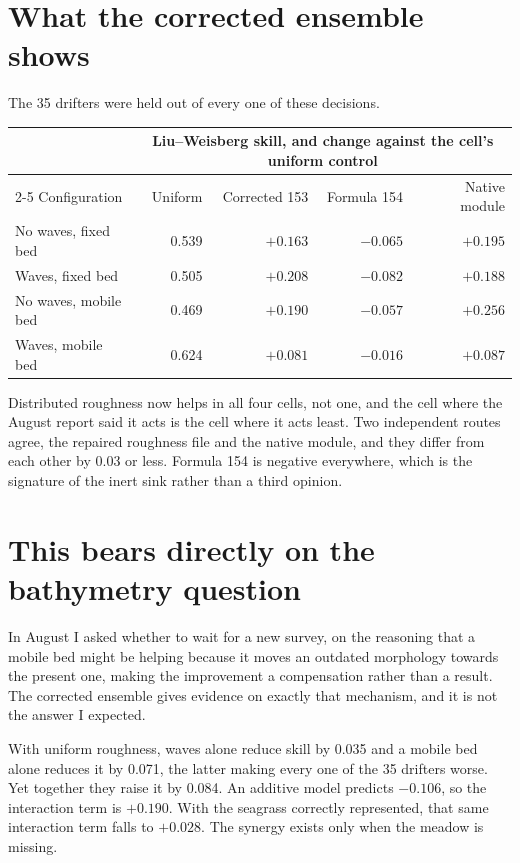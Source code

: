\documentclass[11pt]{article}
\begin{document}
\section{What the corrected ensemble shows}

The 35 drifters were held out of every one of these decisions.

\begin{center}
\begin{tabular}{lrrrr}
\toprule
& \multicolumn{4}{c}{Liu--Weisberg skill, and change against the cell's uniform control} \\
\cmidrule(l){2-5}
Configuration & Uniform & Corrected 153 & Formula 154 & Native module \\
\midrule
No waves, fixed bed   & 0.539 & $+0.163$ & $-0.065$ & $+0.195$ \\
Waves, fixed bed      & 0.505 & $+0.208$ & $-0.082$ & $+0.188$ \\
No waves, mobile bed  & 0.469 & $+0.190$ & $-0.057$ & $+0.256$ \\
Waves, mobile bed     & 0.624 & $+0.081$ & $-0.016$ & $+0.087$ \\
\bottomrule
\end{tabular}
\end{center}

Distributed roughness now helps in all four cells, not one, and the cell where
the August report said it acts is the cell where it acts least. Two independent
routes agree, the repaired roughness file and the native module, and they differ
from each other by 0.03 or less. Formula 154 is negative everywhere, which is
the signature of the inert sink rather than a third opinion.

\section{This bears directly on the bathymetry question}

In August I asked whether to wait for a new survey, on the reasoning that a
mobile bed might be helping because it moves an outdated morphology towards the
present one, making the improvement a compensation rather than a result. The
corrected ensemble gives evidence on exactly that mechanism, and it is not the
answer I expected.

With uniform roughness, waves alone reduce skill by 0.035 and a mobile bed alone
reduces it by 0.071, the latter making every one of the 35 drifters worse. Yet
together they raise it by 0.084. An additive model predicts $-0.106$, so the
interaction term is $+0.190$. With the seagrass correctly represented, that same
interaction term falls to $+0.028$. The synergy exists only when the meadow is
missing.
\end{document}
